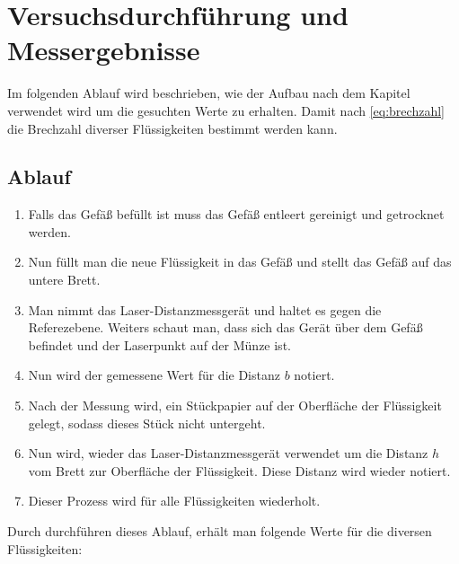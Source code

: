 \documentclass[11pt,ngerman]{scrartcl}
\begin{document}
\section{Versuchsdurchführung und Messergebnisse}
\label{sec:versuchsdurchfuehrung_messergebnisse}
Im folgenden Ablauf wird beschrieben, wie der Aufbau nach 
dem Kapitel  verwendet wird
um die gesuchten Werte zu erhalten. Damit nach \autoref{eq:brechzahl}
die Brechzahl diverser Flüssigkeiten bestimmt werden kann.

\subsection{Ablauf}
\begin{enumerate} \label{en:Ablauf}
    \item Falls das Gefäß befüllt ist muss das Gefäß entleert gereinigt und getrocknet werden.
    \item Nun füllt man die neue Flüssigkeit in das Gefäß und stellt das Gefäß auf das untere Brett.
    \item Man nimmt das Laser-Distanzmessgerät und haltet es gegen die Referezebene. Weiters schaut
        man, dass sich das Gerät über dem Gefäß befindet und der Laserpunkt auf der Münze ist.
    \item Nun wird der gemessene Wert für die Distanz $b$ notiert.
    \item Nach der Messung wird, ein Stückpapier auf der Oberfläche der Flüssigkeit gelegt, sodass
        dieses Stück nicht untergeht.
    \item Nun wird, wieder das Laser-Distanzmessgerät verwendet um die Distanz $h$ vom Brett
        zur Oberfläche der Flüssigkeit. Diese Distanz wird wieder notiert.
    \item Dieser Prozess wird für alle Flüssigkeiten wiederholt.
\end{enumerate}

Durch durchführen dieses Ablauf, erhält man folgende Werte für die diversen Flüssigkeiten:
\end{document}
